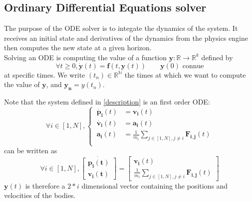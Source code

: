 \documentclass{article}
\newcommand{\myvec}[1]{\ensuremath{\mathbf{#1}}}
\begin{document}
\subsection{Ordinary Differential Equations solver}
\label{solveur}

The purpose of the ODE solver is to integate the dynamics of the system. It receives an initial state and derivatives of the dynamics from the physics engine then computes the new state at a given horizon. \\
Solving an ODE is computing the value of a function $\myvec{y} : \mathbb{R} \rightarrow \mathbb{R}^k$ defined by 
\begin{equation*}
    \forall t \ge 0, \myvec{\dot{y}}(t) = \myvec{f}(t, \myvec{y}(t)) \quad\quad \myvec{y}(0) \text{ connue}
\end{equation*}
at specific times. We write $(t_n) \in \mathbb{R}^\mathbb{N}$ the times at which we want to compute the value of $\myvec{y}$, and $\myvec{y_n} = y(t_n)$.

\vspace{1em}

Note that the system defined in \ref{description} is an first order ODE:
\begin{equation*}
    \forall i \in [1,N], \left\{\begin{aligned}
        \ \myvec{\dot{p_i}}(t) & = \myvec{v_i}(t) \\
        \ \myvec{\dot{v_i}}(t) & = \myvec{a_i}(t) \\
        \ \myvec{a_i}(t) & = \frac{1}{m_i} \sum_{j \in [1,N], j \ne i} \myvec{F_{i,j}}(t) \\
    \end{aligned}\right.
\end{equation*}
can be written as
\begin{equation*}
    \forall i \in [1,N], \myvec{\dot{\left[\begin{aligned}
        \myvec{p_i}(t) \\ \myvec{v_i}(t)
    \end{aligned}\right]}} =
    \left[\begin{gathered}
    \myvec{v_i}(t) \\ \frac{1}{m_i} \sum_{j \in [1,N], j \ne i} \myvec{F_{i,j}}(t)
    \end{gathered}\right]
\end{equation*}
$\myvec{y}(t)$ is therefore a $2 * i$ dimensional vector containing the positions and velocities of the bodies.

\vspace{1em}
\end{document}
